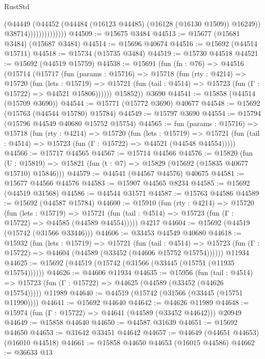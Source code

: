 \begin{lexlean}{RustStd}
\begin{coremodule}
                              (@44449
                                (@44452 (@44484 (@16123 @44485) (@16128 (@16130 @1509)) @16249))
                                @38714))))))))))))))
@44509 := @15675 @3484
@44513 := @15677 (@15681 @3484) (@15687 @3484)
@44514 := @15696 @40674
@44516 := @15692 (@44514 @15711)
@44518 := @15734 (@15735 @3484)
@44519 := @15730 @44518
@44521 := @15692 (@44519 @15759)
@44538 := @15691
    (fun (fn : @76) =>
    @44516
      (@15714
        (@15717
          (fun (params : @15716) =>
          @15718
            (fun (rty : @4214) =>
            @15720
              (fun (lets : @15719) =>
              @15721 (fun (tail : @4514) => @15723 (fun (Γ : @15722) => @44521 @15806))))))
        @15852))
    @3690
@44541 := @15858 (@44514 (@15709 @3690))
@44544 := @15771 (@15772 @3690) @40677
@44548 := @15692 (@15763 (@44544 @15780) @15784)
@44549 := @15797 @3690
@44554 := @15794 (@15796 @44549 @40680 @15752 @15754)
@44565 := fun (params : @15716) =>
  @15718
    (fun (rty : @4214) =>
    @15720
      (fun (lets : @15719) =>
      @15721 (fun (tail : @4514) => @15723 (fun (Γ : @15722) => @44521 (@44548 @44554)))))
@44566 := @15717 @44565
@44567 := @15714 @44566
@44576 := @15820
    (fun (U : @15819) => @15821 (fun (t : @7) => @15829 (@15692 (@15835 @40677 @15710) @15846)))
@44579 := @44541 (@44567 @44576) @40675
@44581 := @15677 @44566 @44576
@44583 := @15907 @44565 @8234
@44585 := @15692 (@44519 @31568)
@44586 := @44544 @31571
@44587 := @15763 @44586
@44589 := @15692 (@44587 @15784)
@44600 := @15910
    (fun (rty : @4214) =>
    @15720
      (fun (lets : @15719) =>
      @15721 (fun (tail : @4514) => @15723 (fun (Γ : @15722) => @44585 (@44589 @44554)))))
    @4217
@44604 := @15692 (@44519 (@15742 (@31566 @33446)))
@44606 := @33453 @44549 @40680
@44618 := @15932
    (fun (lets : @15719) =>
    @15721
      (fun (tail : @4514) =>
      @15723 (fun (Γ : @15722) => @44604 (@44589 (@33452 (@44606 @15752 @15754))))))
    @11934
@44625 := @15692 (@44519 (@15742 (@31566 (@33445 (@15751 (@11935 @15754))))))
@44626 := @44606 @11934
@44635 := @15956
    (fun (tail : @4514) => @15723 (fun (Γ : @15722) => @44625 (@44589 (@33452 (@44626 @15754)))))
    @11989
@44640 := @44519 (@15742 (@31566 (@33445 (@15751 @11990))))
@44641 := @15692 @44640
@44642 := @44626 @11989
@44648 := @15974 (fun (Γ : @15722) => @44641 (@44589 (@33452 @44642))) @20949
@44649 := @15858 @44640
@44650 := @44587 @31639
@44651 := @15692 @44650
@44653 := @31642 @33451 @44642
@44657 := @44649 (@44651 @44653) (@16010 @44518)
@44661 := @15858 @44650 @44653 (@16015 @44586)
@44662 := @36633 @13

\end{coremodule}
\end{lexlean}
